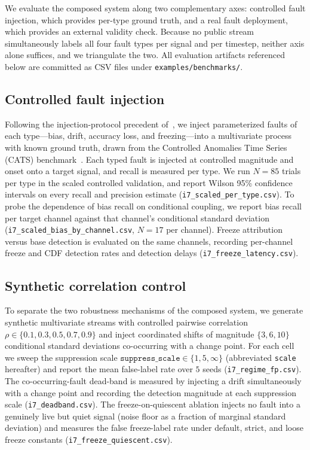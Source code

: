 We evaluate the composed system along two complementary axes: controlled fault injection, which provides per-type ground truth, and a real fault deployment, which provides an external validity check. Because no public stream simultaneously labels all four fault types per signal and per timestep, neither axis alone suffices, and we triangulate the two. All evaluation artifacts referenced below are committed as CSV files under \texttt{examples/benchmarks/}.

\subsection{Controlled fault injection}
Following the injection-protocol precedent of~\citet{Lai2021}, we inject parameterized faults of each type---bias, drift, accuracy loss, and freezing---into a multivariate process with known ground truth, drawn from the Controlled Anomalies Time Series (CATS) benchmark~\citep{CATS2023}. Each typed fault is injected at controlled magnitude and onset onto a target signal, and recall is measured per type. We run $N=85$ trials per type in the scaled controlled validation, and report Wilson 95\% confidence intervals on every recall and precision estimate (\texttt{i7\_scaled\_per\_type.csv}). To probe the dependence of bias recall on conditional coupling, we report bias recall per target channel against that channel's conditional standard deviation (\texttt{i7\_scaled\_bias\_by\_channel.csv}, $N=17$ per channel). Freeze attribution versus base detection is evaluated on the same channels, recording per-channel freeze and CDF detection rates and detection delays (\texttt{i7\_freeze\_latency.csv}).

\subsection{Synthetic correlation control}
To separate the two robustness mechanisms of the composed system, we generate synthetic multivariate streams with controlled pairwise correlation $\rho \in \{0.1, 0.3, 0.5, 0.7, 0.9\}$ and inject coordinated shifts of magnitude $\{3, 6, 10\}$ conditional standard deviations co-occurring with a change point. For each cell we sweep the suppression scale $\texttt{suppress\_scale} \in \{1, 5, \infty\}$ (abbreviated \texttt{scale} hereafter) and report the mean false-label rate over $5$ seeds (\texttt{i7\_regime\_fp.csv}). The co-occurring-fault dead-band is measured by injecting a drift simultaneously with a change point and recording the detection magnitude at each suppression scale (\texttt{i7\_deadband.csv}). The freeze-on-quiescent ablation injects no fault into a genuinely live but quiet signal (noise floor as a fraction of marginal standard deviation) and measures the false freeze-label rate under default, strict, and loose freeze constants (\texttt{i7\_freeze\_quiescent.csv}).

